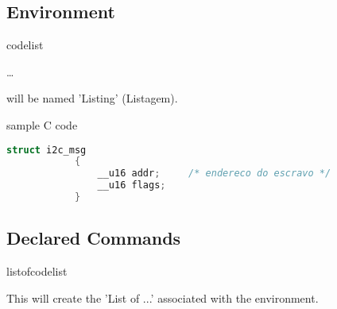 \documentclass[article,nogeometry,english,tocdepth=3,secdepth=3]{ufrgscca} %
\newif\iffulldoc
\begin{document}
\subsection{Environment}
\begin{codedescribe}[env]{codelist}
	\begin{codesyntax}%
		\tsmacro{\begin{codelist}}{}\ldots \tsmacro{\end{codelist}}{}
	\end{codesyntax}
\tsmacro{\caption}{} will be named 'Listing' (Listagem).

\begin{codestore}[st=d.listing]
	\begin{codelist}[htbp]
		\caption{sample C code}
		\label{code01}
		\begin{lstlisting}[language=C]
			struct i2c_msg
			{
				__u16 addr;     /* endereco do escravo */
				__u16 flags;
			}
		\end{lstlisting}
		{\sourcecitation{\textcite{Garg:SMA-2000}}}
	\end{codelist}
\end{codestore}

\end{codedescribe}

\subsection{Declared Commands}
\begin{codedescribe}{listofcodelist}
	\begin{codesyntax}%
		\tsmacro{\listofcodelist}{}
	\end{codesyntax}
This will create the 'List of ...' associated with the  environment.
\end{codedescribe}

\iffulldoc

\begin{codedescribe}{\DeclareNewFloat}
	\begin{codesyntax}%
		\tsmacro{\DeclareNewFloat}{env-name,file-ext,listname,listofname}
	\end{codesyntax}
A new float environment, named \tsobj[env]{env-name}, will be created. Captions will be associated (numbered) as \textbf{\tsobj[meta]{listname} num:}. Finally, an associated command \tsmacro{\listof...}{} will be defined, using \tsobj[meta]{listofname} as a numberless \tsmacro{\chapter}{} title.

\begin{codestore}[st=d.float]
	\def\listingname{Listing}%
	\def\listlistingname{List of Listings}%
	\DeclareNewFloat{codelist}{lox}{\listingname}{\listlistingname}%
 	\listofcodelist
\end{codestore}

\tscode*[emph={codelist,listofcodelist}]{d.float}
\end{codedescribe}
\fi
\end{document}
